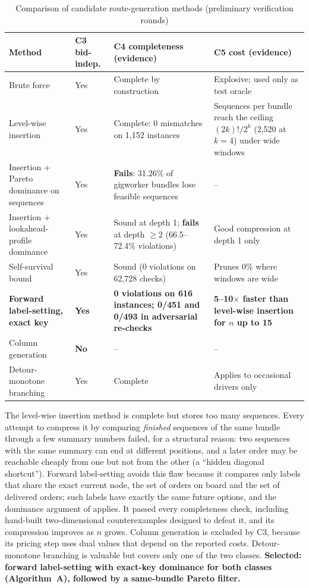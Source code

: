 \begin{table}[t]
\centering
\caption{Comparison of candidate route-generation methods (preliminary verification rounds)}
\label{tab:cmp-gen}
\small
\begin{tabular}{P{3.4cm}P{1.7cm}P{4.6cm}P{4.0cm}}
\toprule
Method & C3 bid-indep. & C4 completeness (evidence) & C5 cost (evidence)\\
\midrule
Brute force & Yes & Complete by construction & Explosive; used only as test oracle\\
Level-wise insertion & Yes & Complete: 0 mismatches on 1,152 instances & Sequences per bundle reach the ceiling $(2k)!/2^k$ (2,520 at $k=4$) under wide windows\\
Insertion + Pareto dominance on sequences & Yes & \textbf{Fails}: 31.26\% of gigworker bundles lose feasible sequences & --\\
Insertion + lookahead-profile dominance & Yes & Sound at depth 1; \textbf{fails} at depth $\ge2$ (66.5--72.4\% violations) & Good compression at depth 1 only\\
Self-survival bound & Yes & Sound (0 violations on 62,728 checks) & Prunes 0\% where windows are wide\\
\textbf{Forward label-setting, exact key} & \textbf{Yes} & \textbf{0 violations on 616 instances; 0/451 and 0/493 in adversarial re-checks} & \textbf{5--10$\times$ faster than level-wise insertion for $n$ up to 15}\\
Column generation & \textbf{No} & -- & --\\
Detour-monotone branching & Yes & Complete & Applies to occasional drivers only\\
\bottomrule
\end{tabular}
\end{table}

The level-wise insertion method is complete but stores too many sequences.
Every attempt to compress it by comparing \emph{finished} sequences of the
same bundle through a few summary numbers failed, for a structural reason:
two sequences with the same summary can end at different positions, and a
later order may be reachable cheaply from one but not from the other (a
``hidden diagonal shortcut''). Forward label-setting avoids this flaw
because it compares only labels that share the exact current node, the set
of orders on board and the set of delivered orders; such labels have
exactly the same future options, and the dominance argument of
\citet{dumas1991pickup} applies. It passed every completeness check,
including hand-built two-dimensional counterexamples designed to defeat
it, and its compression improves as $n$ grows. Column generation is
excluded by C3, because its pricing step uses dual values that depend on the
reported costs. Detour-monotone branching is valuable but covers only one of
the two classes. \textbf{Selected: forward label-setting with exact-key
dominance for both classes (Algorithm~A), followed by a same-bundle Pareto
filter.}

